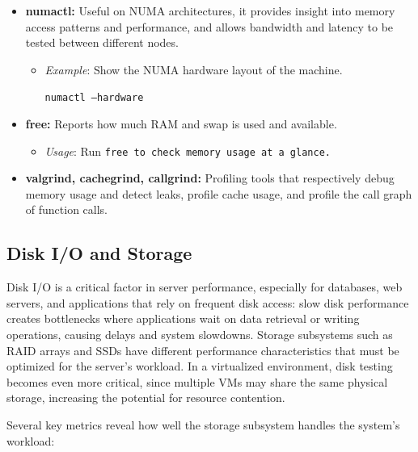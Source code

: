 \begin{exampleblock}
\begin{itemize}
    \item \textbf{numactl:} Useful on NUMA architectures, it provides insight into memory access patterns and performance, and allows bandwidth and latency to be tested between different nodes.
    \begin{itemize}
        \item \textit{Example}: Show the NUMA hardware layout of the machine.

        \begin{center}
        \tt{numactl --hardware}
        \end{center}
    \end{itemize}

    \item \textbf{free:} Reports how much RAM and swap is used and available.
    \begin{itemize}
        \item \textit{Usage}: Run \tt{free} to check memory usage at a glance.
    \end{itemize}

    \item \textbf{valgrind, cachegrind, callgrind:} Profiling tools that respectively debug memory usage and detect leaks, profile cache usage, and profile the call graph of function calls.
\end{itemize}
\end{exampleblock}

\subsection{Disk I/O and Storage} \label{subsec:disk_testing}

Disk I/O is a critical factor in server performance, especially for databases, web servers, and applications that rely on frequent disk access: slow disk performance creates bottlenecks where applications wait on data retrieval or writing operations, causing delays and system slowdowns. Storage subsystems such as RAID arrays and SSDs have different performance characteristics that must be optimized for the server's workload. In a virtualized environment, disk testing becomes even more critical, since multiple VMs may share the same physical storage, increasing the potential for resource contention.

Several key metrics reveal how well the storage subsystem handles the system's workload:

